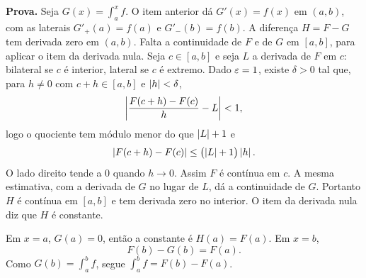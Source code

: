 \documentclass[11pt,a4paper]{article}
\begin{document}
\textbf{Prova.}
Seja $G(x)=\int_a^x f$. O item anterior dá $G'(x)=f(x)$ em $(a,b)$, com as laterais $G'_+(a)=f(a)$ e $G'_-(b)=f(b)$. A diferença $H=F-G$ tem derivada zero em $(a,b)$. Falta a continuidade de $F$ e de $G$ em $[a,b]$, para aplicar o item da derivada nula. Seja $c\in[a,b]$ e seja $L$ a derivada de $F$ em $c$: bilateral se $c$ é interior, lateral se $c$ é extremo. Dado $\varepsilon=1$, existe $\delta>0$ tal que, para $h\neq 0$ com $c+h\in[a,b]$ e $\left\lvert h \right\rvert<\delta$,
\[
\left\lvert \frac{F(c+h)-F(c)}{h}-L \right\rvert<1,
\]
logo o quociente tem módulo menor do que $\left\lvert L \right\rvert+1$ e
\[
\left\lvert F(c+h)-F(c) \right\rvert\le\bigl(\left\lvert L \right\rvert+1\bigr)\left\lvert h \right\rvert.
\]
O lado direito tende a $0$ quando $h\to 0$. Assim $F$ é contínua em $c$. A mesma estimativa, com a derivada de $G$ no lugar de $L$, dá a continuidade de $G$. Portanto $H$ é contínua em $[a,b]$ e tem derivada zero no interior. O item da derivada nula diz que $H$ é constante.

Em $x=a$, $G(a)=0$, então a constante é $H(a)=F(a)$. Em $x=b$,
\[
F(b)-G(b)=F(a).
\]
Como $G(b)=\int_a^b f$, segue $\int_a^b f=F(b)-F(a)$.
\end{document}
